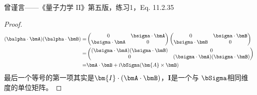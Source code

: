 曾谨言——《量子力学 II》第五版，练习1，Eq. 11.2.35
\begin{proof}
    \begin{equation}
        \begin{aligned}
            (\balpha \cdot \bmA) (\balpha \cdot \bmB) =&
            \begin{pmatrix}
                0                   &  \bsigma \cdot \bmA  \\
                \bsigma \cdot \bmA   & 0
            \end{pmatrix}
            \begin{pmatrix}
                0                   &  \bsigma \cdot \bmB  \\
                \bsigma \cdot \bmB   & 0
            \end{pmatrix} \\
        =& \begin{pmatrix}
            (\bsigma \cdot \bmA) (\bsigma \cdot \bmB)  &  0 \\
            0  &  (\bsigma \cdot \bmA) (\bsigma \cdot \bmB) \\
           \end{pmatrix} \\
        =& \bmA \cdot \bmB + {\rm i} \bSigma (\bm{A} \times \bmB)
        \end{aligned}
    \end{equation}
    最后一个等号的第一项其实是$\bm{I} \cdot (\bmA \cdot \bmB)$，$\bm{I}$是一个与
    $\bSigma$相同维度的单位矩阵。
\end{proof}

